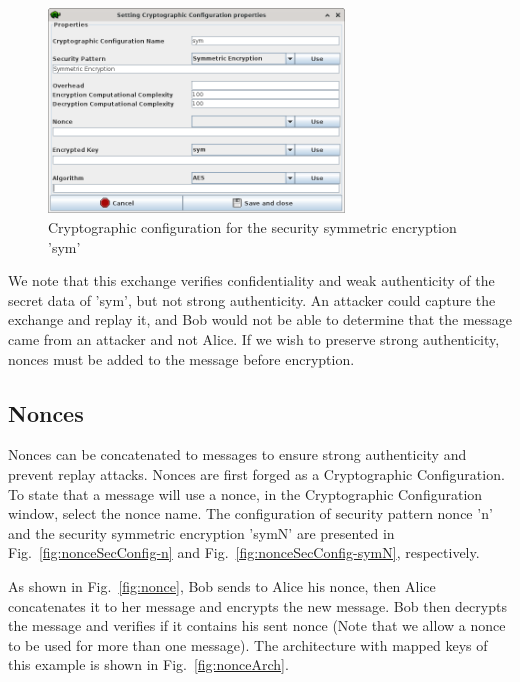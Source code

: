 \documentclass{llncs}
\begin{document}
\begin{figure}[htbp]
	\centering	\includegraphics[width=0.7\textwidth]{figures/securityStuff/encrypt-config-symmetric.png}
	\caption{Cryptographic configuration for the security symmetric encryption 'sym'}
	\label{fig:sampleSecConfig}
\end{figure}

We note that this exchange verifies confidentiality and weak authenticity of the secret data of 'sym', but not strong
authenticity. An attacker could capture the exchange and replay it, and Bob would not be able to determine that the
message came from an attacker and not Alice. If we wish to preserve strong authenticity, nonces must be added to the
message before encryption.

\subsection{Nonces}

Nonces can be concatenated to messages to ensure strong authenticity and prevent replay attacks. Nonces are first forged
as a Cryptographic Configuration. To state that a message will use a nonce, in the Cryptographic Configuration window,
select the nonce name. 
The configuration of security pattern nonce 'n' and the security symmetric encryption 'symN' are presented in Fig.~\ref{fig:nonceSecConfig-n} and Fig.~\ref{fig:nonceSecConfig-symN}, respectively.

As shown in Fig.~\ref{fig:nonce}, Bob sends to Alice his
nonce, then Alice concatenates it to her message and encrypts the new message. Bob then decrypts the message and verifies if it contains his sent nonce (Note that
we allow a nonce to be used for more than one message).
The architecture with mapped keys of this example is shown in Fig.~\ref{fig:nonceArch}.
\end{document}
